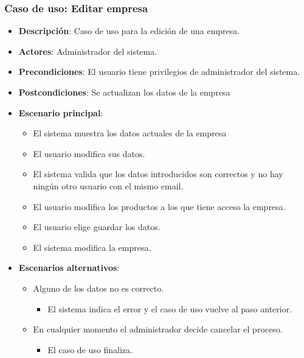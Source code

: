 \documentclass[12pt,a4paperpaper,]{report}
\providecommand{\tightlist}{%
  \setlength{\itemsep}{0pt}\setlength{\parskip}{0pt}}
\begin{document}
\subsubsection{Caso de uso: Editar
empresa}\label{caso-de-uso-editar-empresa}

\begin{itemize}
\tightlist
\item
  \textbf{Descripción}: Caso de uso para la edición de una empresa.
\item
  \textbf{Actores}: Administrador del sistema.
\item
  \textbf{Precondiciones}: El usuario tiene privilegios de administrador
  del sistema.
\item
  \textbf{Postcondiciones}: Se actualizan los datos de la empresa
\item
  \textbf{Escenario principal}:

  \begin{itemize}
  \tightlist
  \item
    El sistema muestra los datos actuales de la empresa
  \item
    El usuario modifica sus datos.
  \item
    El sistema valida que los datos introducidos son correctos y no hay
    ningún otro usuario con el mismo email.
  \item
    El usuario modifica los productos a los que tiene acceso la empresa.
  \item
    El usuario elige guardar los datos.
  \item
    El sistema modifica la empresa.
  \end{itemize}
\item
  \textbf{Escenarios alternativos}:

  \begin{itemize}
  \tightlist
  \item
    Alguno de los datos no es correcto.

    \begin{itemize}
    \tightlist
    \item
      El sistema indica el error y el caso de uso vuelve al paso
      anterior.
    \end{itemize}
  \item
    En cualquier momento el administrador decide cancelar el proceso.

    \begin{itemize}
    \tightlist
    \item
      El caso de uso finaliza.
    \end{itemize}
  \end{itemize}
\end{itemize}
\end{document}
